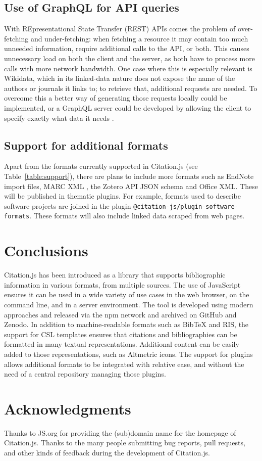 \documentclass[fleqn,10pt,lineno]{wlpeerj} %
\begin{document}
\subsection*{Use of GraphQL for API queries}

With REpresentational State Transfer (REST) APIs comes the problem of over-fetching and under-fetching: when fetching a resource it may contain too much unneeded information, require additional calls to the API, or both. This causes unnecessary load on both the client and the server, as both have to process more calls with more network bandwidth. One case where this is especially relevant is Wikidata, which in its linked-data nature does not expose the name of the authors or journals it links to; to retrieve that, additional requests are needed. To overcome this a better way of generating those requests locally could be implemented, or a GraphQL server could be developed by allowing the client to specify exactly what data it needs \citep{noauthor_graphql_2018}.

\subsection*{Support for additional formats}

Apart from the formats currently supported in Citation.js (see Table~\ref{table:support}), there are plans to include more formats such as EndNote import files, MARC XML \citep{avram_machine-readable_nodate}, the Zotero API JSON schema and Office XML. These will be published in thematic plugins. For example, formats used to describe software projects are joined in the plugin \texttt{@citation-js/plugin-software-formats}. These formats will also include linked data scraped from web pages.

\section*{Conclusions}

Citation.js has been introduced as a library that supports bibliographic information in various formats, from multiple sources. The use of JavaScript ensures it can be used in a wide variety of use cases in the web browser, on the command line, and in a server environment. The tool is developed using modern approaches and released via the npm network and archived on GitHub and Zenodo. In addition to machine-readable formats such as BibTeX and RIS, the support for CSL templates ensures that citations and bibliographies can be formatted in many textual representations. Additional content can be easily added to those representations, such as Altmetric icons. The support for plugins allows additional formats to be integrated with relative ease, and without the need of a central repository managing those plugins.

\section*{Acknowledgments}

Thanks to JS.org for providing the (sub)domain name for the homepage of Citation.js.
Thanks to the many people submitting bug reports, pull requests, and other kinds of feedback during the development of Citation.js.


\end{document}

